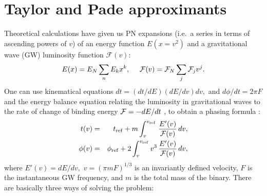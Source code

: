 \section{Taylor and Pade approximants}
Theoretical calculations have given us PN expansions
(i.e.\ a series in terms of ascending powers of $v$) of an energy
function $E(x=v^2)$ and a gravitational wave (GW) luminosity
function $\mathcal{F}(v):$
\begin{equation}
E(x) = E_N \sum_n E_k x^k,\ \ \ \ {\cal F}(v) = {\cal F}_N \sum_j {\cal F}_j v^j.
\end{equation}
One can use kinematical equations $dt = (dt/dE)(dE/dv) dv,$ and
$d\phi/dt = 2\pi F$ and the energy balance equation relating the
luminosity in gravitational waves to the rate of change of
binding energy ${\cal F} = - dE/dt$ , to obtain a phasing formula \cite {dis3}:
\begin{eqnarray}
t(v) & = & t_{\rm ref} + m \int_v^{v_{\rm ref}} \,
\frac{E'(v)}{{\cal F}(v)} \, dv, \nonumber \\
\phi (v) & = & \phi_{\rm ref} + 2 \int_v^{v_{\rm ref}}  v^3 \,
\frac{E'(v)}{{\cal F}(v)} \, dv,
\label{InspiralWavePhasingFormula}
\end{eqnarray}
where $E'(v)=dE/dv,$ $v=(\pi m F)^{1/3}$ is an invariantly defined velocity,
$F$ is the instantaneous GW frequency, and $m$ is the total mass
of the binary.  There are basically three ways of solving the problem:
